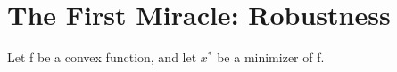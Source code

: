 \documentclass[11pt]{book} %
\begin{document}









\chapter{The First Miracle: Robustness}

Let f be a convex function, and let $x^*$ be a minimizer of f. 
\end{document}
